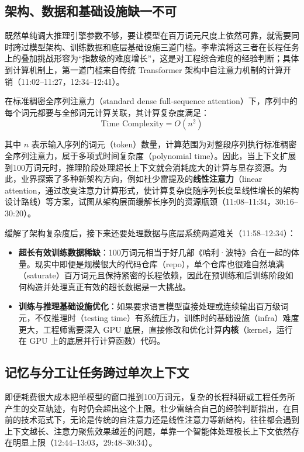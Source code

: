 \documentclass[UTF8,a4paper,11pt,fontset=fandol]{ctexart}
\begin{document}
\subsection{架构、数据和基础设施缺一不可}
既然单纯调大推理引擎参数不够，要让模型在百万词元尺度上依然可靠，就需要同时跨过模型架构、训练数据和底层基础设施三道门槛。李辈滨将这三者在长程任务上的叠加挑战形容为“指数级的难度增长”，这是对工程综合难度的经验判断；具体到计算机制上，第一道门槛来自传统 Transformer 架构中自注意力机制的计算开销（11:02–11:27，12:34–12:41）。

在标准稠密全序列注意力（standard dense full-sequence attention）下，序列中的每个词元都要与全部词元计算关联，其计算复杂度满足：
\[
\text{Time Complexity} = O(n^2)
\]

其中 \(n\) 表示输入序列的词元（token）数量，计算范围为对整段序列执行标准稠密全序列注意力，属于多项式时间复杂度（polynomial time）。因此，当上下文扩展到100万词元时，推理阶段处理超长上下文就会消耗庞大的计算与显存资源。为此，业界探索了多种新架构方向，例如杜少雷提及的\textbf{线性注意力}（linear attention，通过改变注意力计算形式，使计算复杂度随序列长度呈线性增长的架构设计路线）等方案，试图从架构层面缓解长序列的资源瓶颈（11:08–11:34，30:16–30:20）。

缓解了架构复杂度后，接下来还要处理数据与底层系统两道难关（11:58–12:34）：
\begin{itemize}
\item \textbf{超长有效训练数据稀缺}：100万词元相当于好几部《哈利·波特》合在一起的体量。现实中即便是规模很大的代码仓库（repo），单个仓库也很难自然填满（saturate）百万词元且保持紧密的长程依赖，因此在预训练和后训练阶段如何构造并处理真正有效的超长数据是一大挑战。
\item \textbf{训练与推理基础设施优化}：如果要求语言模型直接处理或连续输出百万级词元，不仅推理时（testing time）有系统压力，训练时的基础设施（infra）难度更大，工程师需要深入 GPU 底层，直接修改和优化计算\textbf{内核}（kernel，运行在 GPU 上的底层并行计算函数）代码。
\end{itemize}

\subsection{记忆与分工让任务跨过单次上下文}
即便耗费很大成本把单模型的窗口推到100万词元，复杂的长程科研或工程任务所产生的交互轨迹，有时仍会超出这个上限。杜少雷结合自己的经验判断指出，在目前的技术范式下，无论是传统的自注意力还是线性注意力等新结构，往往都会遇到上下文越长、注意力聚焦效果越差的问题，单靠一个智能体处理极长上下文依然存在明显上限（12:44–13:03，29:48–30:34）。
\end{document}
